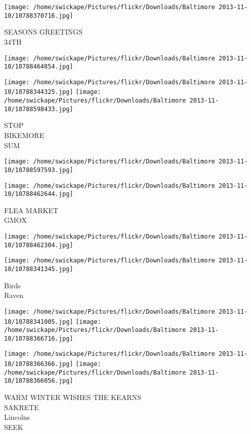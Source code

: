 \documentclass[10pt,letterpaper]{article}
\begin{document}
\vspace{0.25in}
\texttt{[image: /home/swickape/Pictures/flickr/Downloads/Baltimore 2013-11-10/10788370716.jpg]}

SEASONS GREETINGS\\
34TH
\pagebreak

\texttt{[image: /home/swickape/Pictures/flickr/Downloads/Baltimore 2013-11-10/10788464854.jpg]}

\vspace{0.25in}
\texttt{[image: /home/swickape/Pictures/flickr/Downloads/Baltimore 2013-11-10/10788344325.jpg]}
\texttt{[image: /home/swickape/Pictures/flickr/Downloads/Baltimore 2013-11-10/10788598433.jpg]}

STOP\\
BIKEMORE\\
SUM
\pagebreak

\texttt{[image: /home/swickape/Pictures/flickr/Downloads/Baltimore 2013-11-10/10788597593.jpg]}

\vspace{0.25in}
\texttt{[image: /home/swickape/Pictures/flickr/Downloads/Baltimore 2013-11-10/10788462644.jpg]}

FLEA MARKET\\
GMOX
\pagebreak

\texttt{[image: /home/swickape/Pictures/flickr/Downloads/Baltimore 2013-11-10/10788462304.jpg]}

\vspace{0.25in}
\texttt{[image: /home/swickape/Pictures/flickr/Downloads/Baltimore 2013-11-10/10788341345.jpg]}

Birds\\
Raven
\pagebreak

\texttt{[image: /home/swickape/Pictures/flickr/Downloads/Baltimore 2013-11-10/10788341005.jpg]}
\texttt{[image: /home/swickape/Pictures/flickr/Downloads/Baltimore 2013-11-10/10788366716.jpg]}

\texttt{[image: /home/swickape/Pictures/flickr/Downloads/Baltimore 2013-11-10/10788366366.jpg]}
\texttt{[image: /home/swickape/Pictures/flickr/Downloads/Baltimore 2013-11-10/10788366056.jpg]}

WARM WINTER WISHES THE KEARNS\\
SAKRETE\\
Lincolns\\
SEEK
\pagebreak
\end{document}
